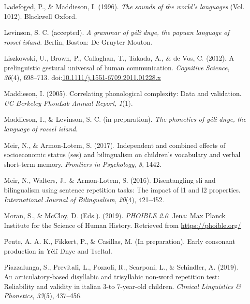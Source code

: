 \documentclass[english,,man,floatsintext]{apa6}
\begin{document}
\hypertarget{ref-ladefoged1996sounds}{}
Ladefoged, P., \& Maddieson, I. (1996). \emph{The sounds of the world's
languages} (Vol. 1012). Blackwell Oxford.

\hypertarget{ref-levinsonYDgrammar}{}
Levinson, S. C. (accepted). \emph{A grammar of yélî dnye, the papuan
language of rossel island}. Berlin, Boston: De Gruyter Mouton.

\hypertarget{ref-liszkowski2012prelinguistic}{}
Liszkowski, U., Brown, P., Callaghan, T., Takada, A., \& de Vos, C.
(2012). A prelinguistic gestural universal of human communication.
\emph{Cognitive Science}, \emph{36}(4), 698--713.
doi:\href{https://doi.org/10.1111/j.1551-6709.2011.01228.x}{10.1111/j.1551-6709.2011.01228.x}

\hypertarget{ref-maddieson2005correlating}{}
Maddieson, I. (2005). Correlating phonological complexity: Data and
validation. \emph{UC Berkeley PhonLab Annual Report}, \emph{1}(1).

\hypertarget{ref-maddiesonIPphoneticsYD}{}
Maddieson, I., \& Levinson, S. C. (in preparation). \emph{The phonetics
of yélî dnye, the language of rossel island}.

\hypertarget{ref-meir2017independent}{}
Meir, N., \& Armon-Lotem, S. (2017). Independent and combined effects of
socioeconomic status (ses) and bilingualism on children's vocabulary and
verbal short-term memory. \emph{Frontiers in Psychology}, \emph{8},
1442.

\hypertarget{ref-meir2016disentangling}{}
Meir, N., Walters, J., \& Armon-Lotem, S. (2016). Disentangling sli and
bilingualism using sentence repetition tasks: The impact of l1 and l2
properties. \emph{International Journal of Bilingualism}, \emph{20}(4),
421--452.

\hypertarget{ref-phoible}{}
Moran, S., \& McCloy, D. (Eds.). (2019). \emph{PHOIBLE 2.0}. Jena: Max
Planck Institute for the Science of Human History. Retrieved from
\url{https://phoible.org/}

\hypertarget{ref-peuteIPconsonants}{}
Peute, A. A. K., Fikkert, P., \& Casillas, M. (In preparation). Early
consonant production in Yélî Dnye and Tseltal.

\hypertarget{ref-piazzalunga2019articulatory}{}
Piazzalunga, S., Previtali, L., Pozzoli, R., Scarponi, L., \& Schindler,
A. (2019). An articulatory-based disyllabic and trisyllabic non-word
repetition test: Reliability and validity in italian 3-to 7-year-old
children. \emph{Clinical Linguistics \& Phonetics}, \emph{33}(5),
437--456.
\end{document}
